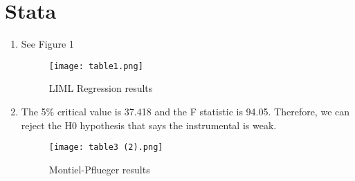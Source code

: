 \documentclass{article}
\begin{document}
\section{Stata}
\begin{enumerate}
\vspace{0.5cm}
\item See Figure 1


\begin{figure}[h]
    \centering
    \texttt{[image: table1.png]}
    \caption{LIML Regression results}
    \label{fig:my_image}
\end{figure}


\item The 5\% critical value is 37.418 and  the F statistic is 94.05. Therefore, we can reject the H0 hypothesis that says the instrumental is weak.

\begin{figure}[h]
    \centering
    \texttt{[image: table3 (2).png]}
    \caption{Montiel-Pflueger results}
    \label{fig:my_image}
\end{figure}

\end{enumerate}
\end{document}
